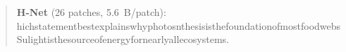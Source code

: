 \begin{quote}
\textbf{H-Net} (26 patches, 5.6~B/patch):\\[1pt]
\allowbreak{}h\allowbreak{}i\allowbreak{}c\allowbreak{}h\allowbreak{}\bb{\textvisiblespace{}}\allowbreak{}s\allowbreak{}t\allowbreak{}a\allowbreak{}t\allowbreak{}e\allowbreak{}m\allowbreak{}e\allowbreak{}n\allowbreak{}t\allowbreak{}\bb{\textvisiblespace{}}\allowbreak{}b\allowbreak{}e\allowbreak{}s\allowbreak{}t\allowbreak{}\bb{\textvisiblespace{}}\allowbreak{}e\allowbreak{}x\allowbreak{}p\allowbreak{}l\allowbreak{}a\allowbreak{}i\allowbreak{}n\allowbreak{}s\allowbreak{}\bb{\textvisiblespace{}}\allowbreak{}w\allowbreak{}h\allowbreak{}y\allowbreak{}\bb{\textvisiblespace{}}\allowbreak{}p\allowbreak{}h\allowbreak{}o\allowbreak{}t\allowbreak{}o\allowbreak{}s\allowbreak{}\allowbreak{}n\allowbreak{}t\allowbreak{}h\allowbreak{}e\allowbreak{}s\allowbreak{}i\allowbreak{}s\allowbreak{}\bb{\textvisiblespace{}}\allowbreak{}i\allowbreak{}s\allowbreak{}\bb{\textvisiblespace{}}\allowbreak{}t\allowbreak{}h\allowbreak{}e\allowbreak{}\bb{\textvisiblespace{}}\allowbreak{}f\allowbreak{}o\allowbreak{}u\allowbreak{}n\allowbreak{}d\allowbreak{}a\allowbreak{}t\allowbreak{}i\allowbreak{}o\allowbreak{}n\allowbreak{}\bb{\textvisiblespace{}}\allowbreak{}o\allowbreak{}f\allowbreak{}\bb{\textvisiblespace{}}\allowbreak{}m\allowbreak{}o\allowbreak{}s\allowbreak{}t\allowbreak{}\bb{\textvisiblespace{}}\allowbreak{}f\allowbreak{}o\allowbreak{}o\allowbreak{}d\allowbreak{}\bb{\textvisiblespace{}}\allowbreak{}w\allowbreak{}e\allowbreak{}b\allowbreak{}s\allowbreak{}\allowbreak{}\bb{\textvisiblespace{}}\allowbreak{}S\allowbreak{}u\allowbreak{}\allowbreak{}l\allowbreak{}i\allowbreak{}g\allowbreak{}h\allowbreak{}t\allowbreak{}\bb{\textvisiblespace{}}\allowbreak{}i\allowbreak{}s\allowbreak{}\bb{\textvisiblespace{}}\allowbreak{}t\allowbreak{}h\allowbreak{}e\allowbreak{}\bb{\textvisiblespace{}}\allowbreak{}s\allowbreak{}o\allowbreak{}u\allowbreak{}r\allowbreak{}c\allowbreak{}e\allowbreak{}\bb{\textvisiblespace{}}\allowbreak{}o\allowbreak{}f\allowbreak{}\bb{\textvisiblespace{}}\allowbreak{}e\allowbreak{}n\allowbreak{}e\allowbreak{}r\allowbreak{}g\allowbreak{}y\allowbreak{}\bb{\textvisiblespace{}}\allowbreak{}f\allowbreak{}o\allowbreak{}r\allowbreak{}\bb{\textvisiblespace{}}\allowbreak{}n\allowbreak{}e\allowbreak{}a\allowbreak{}r\allowbreak{}l\allowbreak{}y\allowbreak{}\bb{\textvisiblespace{}}\allowbreak{}a\allowbreak{}l\allowbreak{}l\allowbreak{}\bb{\textvisiblespace{}}\allowbreak{}e\allowbreak{}c\allowbreak{}o\allowbreak{}s\allowbreak{}y\allowbreak{}s\allowbreak{}t\allowbreak{}e\allowbreak{}m\allowbreak{}s\allowbreak{}.\allowbreak{}\\[6pt]

\end{quote}
